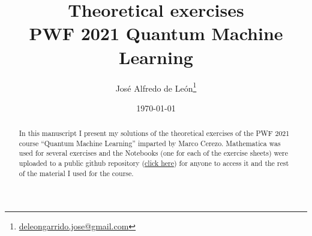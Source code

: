 \documentclass[10pt,a4paper]{article}
\title{\textbf{Theoretical exercises}\\\vspace{2mm}
\large{PWF 2021 Quantum Machine Learning}}
\author[1]{José Alfredo de León\thanks{\href{mailto:deleongarrido.jose@gmail.com}{deleongarrido.jose@gmail.com}}}
\affil[1]{Escuela de Ciencias Físicas y Matemáticas - USAC, Guatemala}
\date{\today}
\newcommand{\1}{\mathbbm{1}}
\begin{document}
\maketitle
\begin{abstract}
In this manuscript I present my solutions of the theoretical exercises of the 
PWF 2021 course ``Quantum Machine Learning'' imparted by Marco Cerezo.
Mathematica was used for several exercises and the Notebooks (one for each
of the exercise sheets) were uploaded to a public github repository 
(\href{https://github.com/deleonja/pwf2021_qml}{click here}) for anyone 
to access it and the rest of the material I used for the course.
\end{abstract}
\tableofcontents




\end{document}
